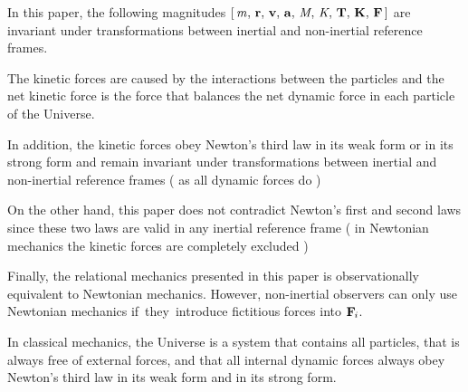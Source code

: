 \documentclass[10pt]{article}
\begin{document}
\par \bigskip \noindent In this paper, the following magnitudes $[ \, {\mathit{m}},\, {\mathbf{r}},\, {\mathbf{v}},\, {\mathbf{a}},\, {\mathit{M}}\hspace{-0.09em},\, {\mathit{K}}\hspace{-0.09em},\, {\mathbf{T}},\, {\mathbf{K}},\, {\mathbf{F}} \, ]$ are invariant under transformations between inertial and non-inertial reference frames.

\par \bigskip \noindent The kinetic forces are caused by the interactions between the particles and the net kinetic force is the force that balances the net dynamic force in each particle of the Universe.

\par \bigskip \noindent In addition, the kinetic forces obey Newton's third law in its weak form or in its strong form and remain invariant under transformations between inertial and non-inertial reference frames ( as all dynamic forces do )

\par \bigskip \noindent On the other hand, this paper does not contradict Newton's first and second laws since these two laws are valid in any inertial reference frame ( in Newtonian mechanics the kinetic forces are completely excluded )

\par \bigskip \noindent Finally, the relational mechanics presented in this paper is observationally equivalent to Newtonian mechanics. However, non-inertial observers can only use Newtonian mechanics \hbox {if they introduce} fictitious forces into ${\mathbf{F}}_{\hspace{-0.09em}i}$.

\newpage

\par {}

\par {}\hypertarget{a1p1}{}

\par \bigskip \noindent In classical mechanics, the Universe is a system that contains all particles, that is always free of external forces, and that all internal dynamic forces always obey Newton's third law in its weak form and in its strong form.
\end{document}
